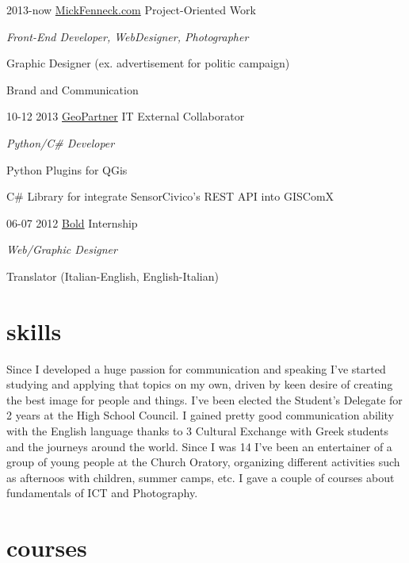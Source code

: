 \documentclass[]{friggeri-cv}
\begin{document}
\begin{entrylist}
  \entry
    {2013-now}
    {\href{http://www.mickfenneck.com}{MickFenneck.com}}
    {Project-Oriented Work}
    {\emph{Front-End Developer, WebDesigner, Photographer}

	{Graphic Designer (ex. advertisement for politic campaign)}

	{Brand and Communication}
    }
\entry
    {10-12 2013}
    {\href{http://www.geopartner.it}{GeoPartner}}
    {IT External Collaborator}
    {\emph{Python/C\# Developer}

	{Python Plugins for QGis}
	
	{C\# Library for integrate SensorCivico's REST API into GISComX}
    }
\entry
    {06-07 2012}
    {\href{http://www.studiobold.it}{Bold}}
    {Internship}
    {\emph{Web/Graphic Designer}

	{Translator (Italian-English, English-Italian)}
    }
\end{entrylist}

\section{skills}

Since I developed a huge passion for communication and speaking I've started studying and applying that topics on my own, driven by keen desire of creating the best image for people and things. I've been elected the Student's Delegate for 2 years at the High School Council. I gained pretty good communication ability with the English language thanks to 3 Cultural Exchange with Greek students and the journeys around the world. Since I was 14 I've been an entertainer of a group of young people at the Church Oratory, organizing different activities such as afternoos with children, summer camps, etc. I gave a couple of courses about fundamentals of ICT and Photography.

\section{courses}
\end{document}
